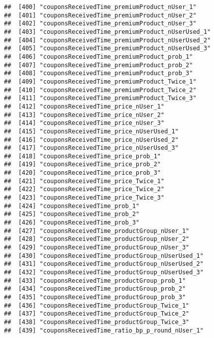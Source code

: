 \documentclass[10pt]{report}
\begin{document}
\begin{verbatim}
##  [400] "couponsReceivedTime_premiumProduct_nUser_1"           
##  [401] "couponsReceivedTime_premiumProduct_nUser_2"           
##  [402] "couponsReceivedTime_premiumProduct_nUser_3"           
##  [403] "couponsReceivedTime_premiumProduct_nUserUsed_1"       
##  [404] "couponsReceivedTime_premiumProduct_nUserUsed_2"       
##  [405] "couponsReceivedTime_premiumProduct_nUserUsed_3"       
##  [406] "couponsReceivedTime_premiumProduct_prob_1"            
##  [407] "couponsReceivedTime_premiumProduct_prob_2"            
##  [408] "couponsReceivedTime_premiumProduct_prob_3"            
##  [409] "couponsReceivedTime_premiumProduct_Twice_1"           
##  [410] "couponsReceivedTime_premiumProduct_Twice_2"           
##  [411] "couponsReceivedTime_premiumProduct_Twice_3"           
##  [412] "couponsReceivedTime_price_nUser_1"                    
##  [413] "couponsReceivedTime_price_nUser_2"                    
##  [414] "couponsReceivedTime_price_nUser_3"                    
##  [415] "couponsReceivedTime_price_nUserUsed_1"                
##  [416] "couponsReceivedTime_price_nUserUsed_2"                
##  [417] "couponsReceivedTime_price_nUserUsed_3"                
##  [418] "couponsReceivedTime_price_prob_1"                     
##  [419] "couponsReceivedTime_price_prob_2"                     
##  [420] "couponsReceivedTime_price_prob_3"                     
##  [421] "couponsReceivedTime_price_Twice_1"                    
##  [422] "couponsReceivedTime_price_Twice_2"                    
##  [423] "couponsReceivedTime_price_Twice_3"                    
##  [424] "couponsReceivedTime_prob_1"                           
##  [425] "couponsReceivedTime_prob_2"                           
##  [426] "couponsReceivedTime_prob_3"                           
##  [427] "couponsReceivedTime_productGroup_nUser_1"             
##  [428] "couponsReceivedTime_productGroup_nUser_2"             
##  [429] "couponsReceivedTime_productGroup_nUser_3"             
##  [430] "couponsReceivedTime_productGroup_nUserUsed_1"         
##  [431] "couponsReceivedTime_productGroup_nUserUsed_2"         
##  [432] "couponsReceivedTime_productGroup_nUserUsed_3"         
##  [433] "couponsReceivedTime_productGroup_prob_1"              
##  [434] "couponsReceivedTime_productGroup_prob_2"              
##  [435] "couponsReceivedTime_productGroup_prob_3"              
##  [436] "couponsReceivedTime_productGroup_Twice_1"             
##  [437] "couponsReceivedTime_productGroup_Twice_2"             
##  [438] "couponsReceivedTime_productGroup_Twice_3"             
##  [439] "couponsReceivedTime_ratio_bp_p_round_nUser_1"         

\end{verbatim}
\end{document}
